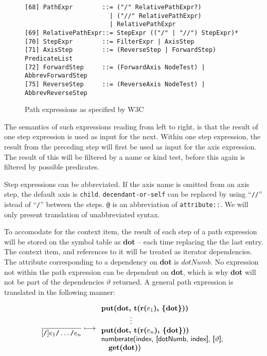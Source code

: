 \begin{figure}[h]
\begin{Verbatim}
[68] PathExpr        ::= ("/" RelativePathExpr?)
                       | ("//" RelativePathExpr)
                       | RelativePathExpr
[69] RelativePathExpr::= StepExpr (("/" | "//") StepExpr)*
[70] StepExpr        ::= FilterExpr | AxisStep
[71] AxisStep        ::= (ReverseStep | ForwardStep) PredicateList
[72] ForwardStep     ::= (ForwardAxis NodeTest) | AbbrevForwardStep
[75] ReverseStep     ::= (ReverseAxis NodeTest) | AbbrevReverseStep
\end{Verbatim}
\label{fig:trans:TD:pathEBNF}
\caption{Path expressions as specified by W3C\cite{w3c00}}
\end{figure}
The semantics of such expressions reading from left to right, is that the result of one step expression is used as
input for the next. Within one step expression, the result from the preceding step will first be used as input for the
axis expression. The result of this will be filtered by a name or kind test, before this again is filtered by
possible predicates.

Step expressions can be abbreviated. If the axis name is omitted from an axis step, the default axis is
\texttt{child}. \texttt{decendant-or-self} can be replaced by using ``\texttt{//}'' istead of ``\texttt{/}''
between the steps. \texttt{@} is an abbreviation of \texttt{attribute::}. We will only present translation of
unabbreviated syntax.

To accomodate for the context item, the result of each step of a path expression will be stored on the symbol
table as \textbf{dot} -- each time replacing the the last entry. The context item, and references to it will be
treated as iterator dependencies. The attribute corresponding to a dependency on \textbf{dot} is $dotNumb$. No
expression not within the path expression can be dependent on \textbf{dot},
which is why \textbf{dot} will not be part of the dependencies $\vartheta$ returned. A general path expression is translated in the following manner:

\begin{equation}
\frac{}{[\mbox{\texttt{/}}]e_1\mbox{\texttt{/}}\ldots\mbox{\texttt{/}}e_n} \longmapsto
\begin{array}{l}
\mbox{\textbf{put(dot, t(r(}}e_1\mbox{\textbf{), \{dot\}))}} \\
\qquad \qquad \vdots \\
\mbox{\textbf{put(dot, t(r(}}e_n\mbox{\textbf{), \{dot\}))}} \\
\mbox{\textsf{numberate(index, [dotNumb, index], [}}\vartheta\mbox{\textsf{];}} \\ \quad
\mbox{\textbf{get(dot)}\textsf{)}}
\end{array}
\label{rule:trans:TD:pathExpr}
\end{equation} 

